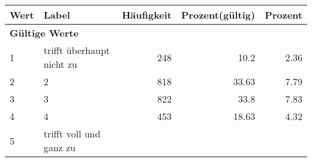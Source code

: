      \begin{longtable}{lXrrr}
     \toprule
     \textbf{Wert} & \textbf{Label} & \textbf{Häufigkeit} & \textbf{Prozent(gültig)} & \textbf{Prozent} \\
     \endhead
     \midrule
     \multicolumn{5}{l}{\textbf{Gültige Werte}}\\

     1 &
     \multicolumn{1}{X}{ trifft überhaupt nicht zu   } &


       \num{248} &
       \num[round-mode=places,round-precision=2]{10,2} &
         \num[round-mode=places,round-precision=2]{2,36} \\

     2 &
     \multicolumn{1}{X}{ 2   } &


       \num{818} &
       \num[round-mode=places,round-precision=2]{33,63} &
         \num[round-mode=places,round-precision=2]{7,79} \\

     3 &
     \multicolumn{1}{X}{ 3   } &


       \num{822} &
       \num[round-mode=places,round-precision=2]{33,8} &
         \num[round-mode=places,round-precision=2]{7,83} \\

     4 &
     \multicolumn{1}{X}{ 4   } &


       \num{453} &
       \num[round-mode=places,round-precision=2]{18,63} &
         \num[round-mode=places,round-precision=2]{4,32} \\

     5 &
     \multicolumn{1}{X}{ trifft voll und ganz zu   } &



\end{longtable}
